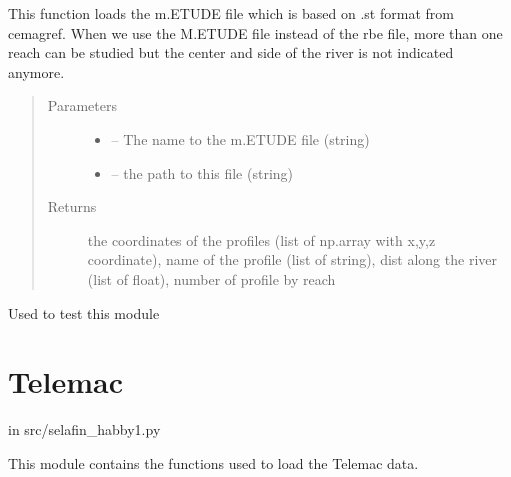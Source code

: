 \documentclass[letterpaper,10pt,english]{sphinxmanual}
\begin{document}
\begin{fulllineitems}
\label{\detokenize{index:src.rubar.m_file_load_coord_1d}}
This function loads the m.ETUDE file which is based on .st format from cemagref. When we use the M.ETUDE file
instead of the rbe file, more than one reach can be studied but the center and side of the river is not
indicated anymore.
\begin{quote}\begin{description}
\item[{Parameters}] \leavevmode\begin{itemize}
\item {} 
 -- The name to the m.ETUDE file (string)

\item {} 
 -- the path to this file (string)

\end{itemize}

\item[{Returns}] \leavevmode
the coordinates of the profiles (list of np.array with x,y,z coordinate), name of the profile
(list of string), dist along the river (list of float), number of profile by reach

\end{description}\end{quote}

\end{fulllineitems}


\begin{fulllineitems}
\label{\detokenize{index:src.rubar.main}}
Used to test this module

\end{fulllineitems}



\section{Telemac}
\label{\detokenize{index:telemac}}
in src/selafin\_habby1.py

This module contains the functions used to load the Telemac data.
\label{\detokenize{index:module-src.selafin_habby1}}
\end{document}
